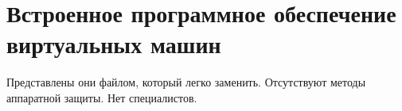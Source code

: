 \section{Встроенное программное обеспечение виртуальных машин}
Представлены они файлом,
	который легко заменить.
Отсутствуют методы аппаратной защиты.
Нет специалистов.
